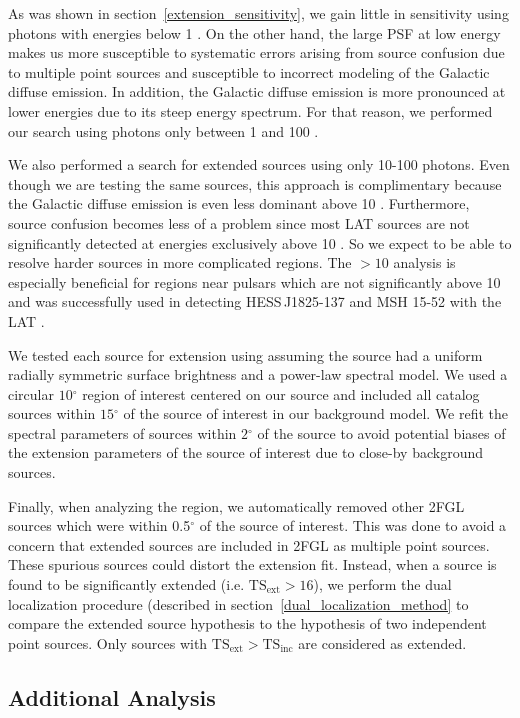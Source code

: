 \documentclass[12pt,preprint]{aastex}
\newcommand{\gev}{\text{GeV}\xspace}
\newcommand{\tsext}{{\ensuremath{\text{TS}_{\text{ext}}}}\xspace}
\newcommand{\tsinc}{\ensuremath{\text{TS}_{\text{inc}}}\xspace}
\renewcommand{\deg}{\ensuremath{^\circ}\xspace}
\newcommand{\pointlike}{\text{\em pointlike}\xspace}
\begin{document}
As was shown in section~\ref{extension_sensitivity}, we gain little in sensitivity using photons with energies
below 1 \gev. On the other hand, the large PSF at low energy makes us
more susceptible to systematic errors arising from source confusion due
to multiple point sources and susceptible to incorrect modeling of the
Galactic diffuse emission. In addition, the Galactic diffuse emission
is more pronounced at lower energies due to its steep energy spectrum.
For that reason, we performed our search using photons only between 1
\gev and 100 \gev. 

We also performed a search for extended sources using only 10-100 \gev photons. 
Even though we are testing the same
sources, this approach is complimentary because the Galactic diffuse
emission is even less dominant above 10 \gev. Furthermore, source
confusion becomes less of a problem since most LAT sources are not
significantly detected at energies exclusively above 10 \gev. So we
expect to be able to resolve harder sources in more complicated regions. The $>10$ \gev
analysis is
especially
beneficial for regions near pulsars which are not significantly above 10 \gev and was
successfully used in detecting HESS\,J1825-137 and MSH 15-52 with the LAT
\citep{msh1552,fermi_hess_j1825}.

We tested each source for extension using
\pointlike
assuming the source had a uniform radially symmetric surface brightness
and a power-law spectral model.
We used a circular $10\deg$ region of interest centered on our source and
included all catalog sources within $15\deg$ of the source of interest
in our background model.
We refit the spectral parameters of sources within $2\deg$ of the source
to avoid potential biases of the extension parameters of the source of
interest due to close-by background sources.

Finally, when analyzing the region, we automatically removed other 2FGL
sources which were within 0.5\deg of the source of interest. This was
done to avoid a concern that extended sources are included in 2FGL as
multiple point sources. These spurious sources could distort the
extension fit.  Instead, when a source is found to be significantly
extended (i.e. $\tsext>16$), we perform the dual localization procedure
(described in section~\ref{dual_localization_method} to compare the
extended source hypothesis to the hypothesis of two independent point
sources. Only sources with $\tsext>\tsinc$ are considered as extended.

\subsection{Additional Analysis}
\end{document}
